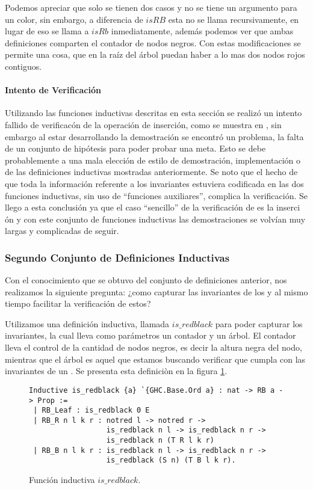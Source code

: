 Podemos apreciar que solo se tienen dos casos y no se tiene un argumento para un color, sin
embargo, a diferencia de $isRB$ esta no se llama recursivamente, en lugar de eso se llama a $isRb$
inmediatamente, además podemos ver que ambas definiciones comparten el contador de nodos negros.
Con estas modificaciones se permite una cosa, que en la ra\'iz del \'arbol puedan haber a lo mas
dos nodos rojos contiguos.

\paragraph{Intento de Verificaci\'on}
Utilizando las funciones inductivas descritas en esta secci\'on se realiz\'o un intento fallido de
verificac\'on de la operaci\'on de inserci\'on, como se muestra en \cite{appel}, sin embargo al
estar desarrollando la demostraci\'on se encontró un problema, la falta de un conjunto de
hipótesis para poder probar una meta. Esto se debe probablemente a una mala elección de estilo de
demostraci\'on, implementaci\'on o de las definiciones inductivas mostradas anteriormente. Se noto
que el hecho de que toda la informaci\'on referente a los invariantes estuviera codificada en las
dos funciones inductivas, sin uso de ``funciones auxiliares'', complica la verificaci\'on. Se
llego a esta conclusi\'on ya que el caso ``sencillo'' de la verificaci\'on de {\arns} es la inserci
\'on y con este conjunto de funciones inductivas las demostraciones se volvían muy largas y
complicadas de seguir.

\subsubsection{Segundo Conjunto de Definiciones Inductivas}

Con el conocimiento que se obtuvo del conjunto de definiciones anterior, nos realizamos la
siguiente pregunta: ¿como capturar las invariantes de los {\arns} y al mismo tiempo facilitar la
verificaci\'on de estos?

Utilizamos una definición inductiva, llamada $is\_redblack$ para poder capturar los invariantes,
la cual lleva como parámetros un contador y un \'arbol. El contador lleva el control de la
cantidad de nodos negros, es decir la altura negra del nodo, mientras que el \'arbol es aquel que
estamos buscando verificar que cumpla con las invariantes de un {\arn}. Se presenta esta definici\`
on en la figura \ref{inductive_isRedB}.

\begin{figure}
\centering
\captionsetup{justification=centering}
\begin{verbatim}
Inductive is_redblack {a} `{GHC.Base.Ord a} : nat -> RB a -> Prop :=
 | RB_Leaf : is_redblack 0 E
 | RB_R n l k r : notred l -> notred r ->
                  is_redblack n l -> is_redblack n r ->
                  is_redblack n (T R l k r)
 | RB_B n l k r : is_redblack n l -> is_redblack n r ->
                  is_redblack (S n) (T B l k r).
\end{verbatim}
\caption{Funci\'on inductiva $is\_redblack$.}
\label{inductive_isRedB}
\end{figure}


